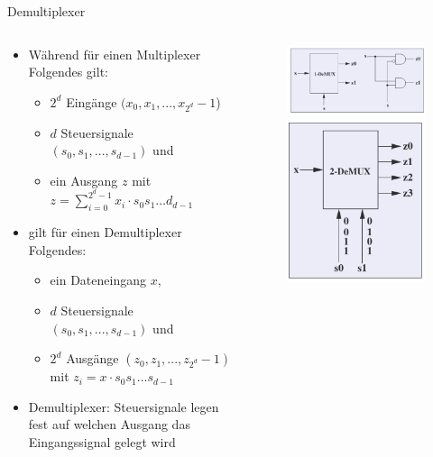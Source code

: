 \documentclass[12pt%
,xcolor=table
,aspectratio=169%
]{beamer}
\begin{document}
\begin{frame}{Demultiplexer}
\begin{columns}[T] %
\begin{column}{.6\textwidth}
\begin{itemize}
		\item Während für einen Multiplexer Folgendes gilt:
		\begin{itemize}
			\item $2^d$ Eingänge $(x_0 , x_1 , ..., x_{2^d} - 1$)
			\item $d$ Steuersignale $(s_0 , s_1 , ..., s_{d-1} )$ und
			\item ein Ausgang $z$ mit $z = \sum_{i=0}^{2^d-1} x_i \cdot s_0 s_1 \ldots d_{d-1}$
		\end{itemize}
		\item gilt für einen Demultiplexer Folgendes:
		\begin{itemize}
			\item ein Dateneingang $x$,
			\item $d$ Steuersignale $(s_0 , s_1 , ..., s_{d-1} )$ und
			\item $2^d$ Ausgänge $(z_0 , z_1 , ..., z_{2^d} -1 )$ mit $z_i = x \cdot s_0 s_1 ...s_{d-1}$
		\end{itemize}
		\item Demultiplexer: Steuersignale legen fest auf welchen Ausgang das Eingangssignal gelegt wird
	\end{itemize}
\end{column}%
\hfill%
\begin{column}{.48\textwidth}
\centering
\begin{figure}
\includegraphics[scale=0.3]{pictures/demux1}\\
\includegraphics[scale=0.3]{pictures/demux2}

\end{figure}
\end{column}
\end{columns}
\end{frame}
\end{document}
